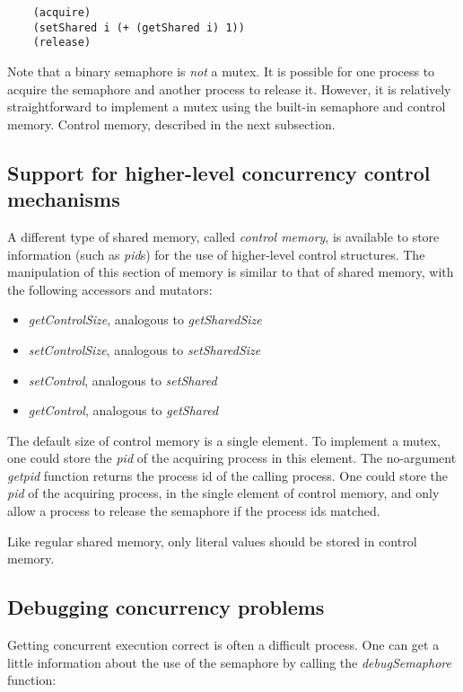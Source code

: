 \begin{verbatim}
    (acquire)
    (setShared i (+ (getShared i) 1))
    (release)
\end{verbatim}

Note that a binary semaphore is {\it not} a mutex. It is possible for
one process to acquire the semaphore and another process to release it.
However, it is relatively straightforward to implement a mutex using
the built-in semaphore and control memory.
Control memory,
described in the next subsection.

\subsection{Support for higher-level concurrency control mechanisms}

A different type of shared memory, called {\it control memory},
is available to store
information (such as {\it pid}s) for the use of higher-level control
structures. The manipulation of this section of memory is similar to
that of shared memory, with the following accessors and mutators:

\begin{itemize}
\item
        {\it getControlSize}, analogous to {\it getSharedSize}
\item
        {\it setControlSize}, analogous to {\it setSharedSize}
\item
        {\it setControl}, analogous to {\it setShared}
\item
        {\it getControl}, analogous to {\it getShared}
\end{itemize}

The default size of control memory is a single element.
To implement a mutex, one could store the {\it pid} of the acquiring
process in this element.
The no-argument
{\it getpid} function returns the process id of the calling process.
One could store the {\it pid} of the acquiring process,
in the single element of control  memory, and only allow
a process to release the semaphore if the process ids matched.

Like regular shared memory, only literal values should be stored
in control memory.

\subsection{Debugging concurrency problems}

Getting concurrent execution correct is often a difficult process.
One can get a little information about the use of the semaphore 
by calling the {\it debugSemaphore} function:

